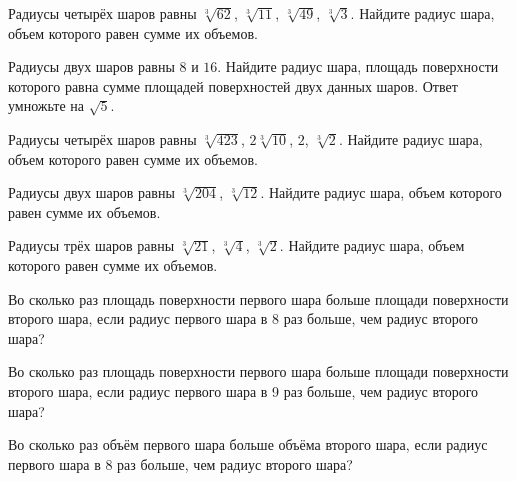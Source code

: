 \documentclass[a4paper]{article}
\begin{document}
\begin{taskBN}{9}
Радиусы четырёх шаров равны $\sqrt[3]{62}$, $\sqrt[3]{11}$, $\sqrt[3]{49}$, $\sqrt[3]{3}$. Найдите радиус шара, объем которого равен сумме их объемов.
\end{taskBN}

\begin{taskBN}{10}
Радиусы двух шаров равны $8$ и $16$. Найдите радиус шара, площадь поверхности которого равна сумме площадей поверхностей двух данных шаров. Ответ умножьте на $\sqrt{5}$.
\end{taskBN}

\begin{taskBN}{11}
Радиусы четырёх шаров равны $\sqrt[3]{423}$, $2\sqrt[3]{10}$, $2$, $\sqrt[3]{2}$. Найдите радиус шара, объем которого равен сумме их объемов.
\end{taskBN}

\begin{taskBN}{12}
Радиусы двух шаров равны $\sqrt[3]{204}$, $\sqrt[3]{12}$. Найдите радиус шара, объем которого равен сумме их объемов.
\end{taskBN}

\begin{taskBN}{13}
Радиусы трёх шаров равны $\sqrt[3]{21}$, $\sqrt[3]{4}$, $\sqrt[3]{2}$. Найдите радиус шара, объем которого равен сумме их объемов.
\end{taskBN}

\begin{taskBN}{14}
Во сколько раз площадь поверхности первого шара больше площади поверхности второго шара, если радиус первого шара в 8 раз больше, чем радиус второго шара?
\end{taskBN}

\begin{taskBN}{15}
Во сколько раз площадь поверхности первого шара больше площади поверхности второго шара, если радиус первого шара в 9 раз больше, чем радиус второго шара?
\end{taskBN}

\begin{taskBN}{16}
Во сколько раз объём первого шара больше объёма второго шара, если радиус первого шара в 8 раз больше, чем радиус второго шара?
\end{taskBN}
\end{document}
